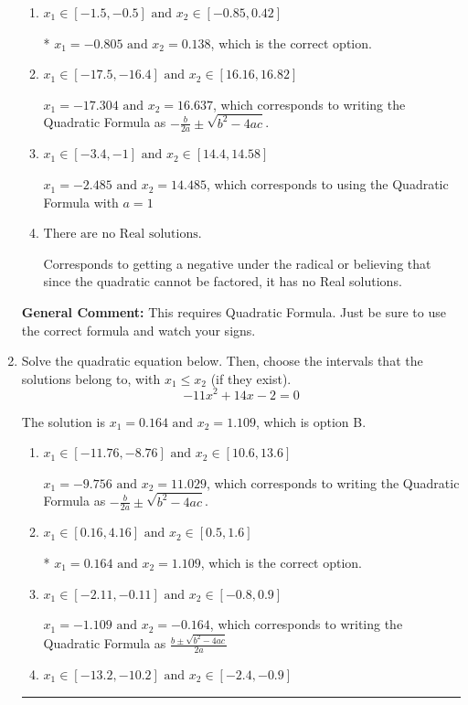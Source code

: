 \documentclass{extbook}[14pt]
\newcommand{\litem}[1]{\item #1

\rule{\textwidth}{0.4pt}}
\begin{document}
\begin{enumerate}
{\begin{enumerate}[label=\Alph*.]
 $x_1 = -0.138 \text{ and } x_2 = 0.805$, which corresponds to writing the Quadratic Formula as $\frac{b \pm \sqrt{b^2 - 4ac}}{2a}$
\item \( x_1 \in [-1.5, -0.5] \text{ and } x_2 \in [-0.85, 0.42] \)

* $x_1 = -0.805 \text{ and } x_2 = 0.138$, which is the correct option.
\item \( x_1 \in [-17.5, -16.4] \text{ and } x_2 \in [16.16, 16.82] \)

 $x_1 = -17.304 \text{ and } x_2 = 16.637$, which corresponds to writing the Quadratic Formula as $-\frac{b}{2a} \pm \sqrt{b^2 - 4ac}$.
\item \( x_1 \in [-3.4, -1] \text{ and } x_2 \in [14.4, 14.58] \)

 $x_1 = -2.485 \text{ and } x_2 = 14.485$, which corresponds to using the Quadratic Formula with $a=1$
\item \( \text{There are no Real solutions.} \)

Corresponds to getting a negative under the radical or believing that since the quadratic cannot be factored, it has no Real solutions.
\end{enumerate}

\textbf{General Comment:} This requires Quadratic Formula. Just be sure to use the correct formula and watch your signs.
}
\litem{
Solve the quadratic equation below. Then, choose the intervals that the solutions belong to, with $x_1 \leq x_2$ (if they exist).
\[ -11x^{2} +14 x -2 = 0 \]

The solution is \( x_1 = 0.164 \text{ and } x_2 = 1.109 \), which is option B.\begin{enumerate}[label=\Alph*.]
\item \( x_1 \in [-11.76, -8.76] \text{ and } x_2 \in [10.6, 13.6] \)

 $x_1 = -9.756 \text{ and } x_2 = 11.029$, which corresponds to writing the Quadratic Formula as $-\frac{b}{2a} \pm \sqrt{b^2 - 4ac}$.
\item \( x_1 \in [0.16, 4.16] \text{ and } x_2 \in [0.5, 1.6] \)

* $x_1 = 0.164 \text{ and } x_2 = 1.109$, which is the correct option.
\item \( x_1 \in [-2.11, -0.11] \text{ and } x_2 \in [-0.8, 0.9] \)

 $x_1 = -1.109 \text{ and } x_2 = -0.164$, which corresponds to writing the Quadratic Formula as $\frac{b \pm \sqrt{b^2 - 4ac}}{2a}$
\item \( x_1 \in [-13.2, -10.2] \text{ and } x_2 \in [-2.4, -0.9] \)


\end{enumerate}}
\end{enumerate}
\end{document}
